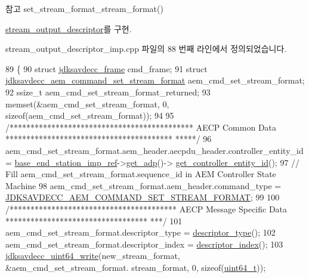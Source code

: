 \begin{DoxySeeAlso}{참고}
set\+\_\+stream\+\_\+format\+\_\+stream\+\_\+format() 
\end{DoxySeeAlso}


\hyperlink{classavdecc__lib_1_1stream__output__descriptor_a7407f2ca9a5a63a404e5f96ccdbf31f3}{stream\+\_\+output\+\_\+descriptor}를 구현.



stream\+\_\+output\+\_\+descriptor\+\_\+imp.\+cpp 파일의 88 번째 라인에서 정의되었습니다.


\begin{DoxyCode}
89 \{
90     \textcolor{keyword}{struct }\hyperlink{structjdksavdecc__frame}{jdksavdecc\_frame} cmd\_frame;
91     \textcolor{keyword}{struct }\hyperlink{structjdksavdecc__aem__command__set__stream__format}{jdksavdecc\_aem\_command\_set\_stream\_format} 
      aem\_cmd\_set\_stream\_format;
92     ssize\_t aem\_cmd\_set\_stream\_format\_returned;
93     memset(&aem\_cmd\_set\_stream\_format, 0, \textcolor{keyword}{sizeof}(aem\_cmd\_set\_stream\_format));
94 
95     \textcolor{comment}{/******************************************** AECP Common Data ****************************************
      *****/}
96     aem\_cmd\_set\_stream\_format.aem\_header.aecpdu\_header.controller\_entity\_id = 
      \hyperlink{classavdecc__lib_1_1descriptor__base__imp_a550c969411f5f3b69f55cc139763d224}{base\_end\_station\_imp\_ref}->\hyperlink{classavdecc__lib_1_1end__station__imp_a471a74540ce6182fad0c17dfd010107e}{get\_adp}()->
      \hyperlink{classavdecc__lib_1_1adp_a0c0959a46658c0a22e9530334b2912da}{get\_controller\_entity\_id}();
97     \textcolor{comment}{// Fill aem\_cmd\_set\_stream\_format.sequence\_id in AEM Controller State Machine}
98     aem\_cmd\_set\_stream\_format.aem\_header.command\_type = 
      \hyperlink{group__command_ga5a4c1db8bb66e83da7bcdff6a4e2c7e7}{JDKSAVDECC\_AEM\_COMMAND\_SET\_STREAM\_FORMAT};
99 
100     \textcolor{comment}{/**************************************** AECP Message Specific Data **********************************
      ***/}
101     aem\_cmd\_set\_stream\_format.descriptor\_type = \hyperlink{classavdecc__lib_1_1descriptor__base__imp_aefc543029ab093823c3f5b9d84f0ccc4}{descriptor\_type}();
102     aem\_cmd\_set\_stream\_format.descriptor\_index = \hyperlink{classavdecc__lib_1_1descriptor__base__imp_ac23c0a35276c07cfce8c8660700c2135}{descriptor\_index}();
103     \hyperlink{group__endian_gaa294fd85c2d887032dad294c6833c903}{jdksavdecc\_uint64\_write}(new\_stream\_format, &aem\_cmd\_set\_stream\_format.
      stream\_format, 0, \textcolor{keyword}{sizeof}(\hyperlink{parse_8c_aec6fcb673ff035718c238c8c9d544c47}{uint64\_t}));

\end{DoxyCode}
